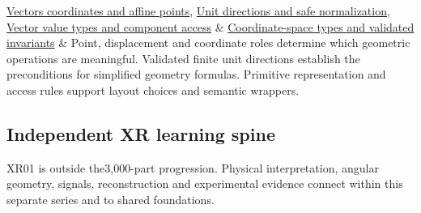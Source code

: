 {\begin{longtable}[]
\hyperref[appendix-0659864c0aa3]{Vectors coordinates and affine points}, \hyperref[appendix-f744e41b95b4]{Unit directions and safe normalization}, \hyperref[appendix-37a39984ba66]{Vector value types and component access} & \hyperref[appendix-380a220e2529]{Coordinate-space types and validated invariants} & Point, displacement and coordinate roles determine which geometric operations are meaningful. Validated finite unit directions establish the preconditions for simplified geometry formulas. Primitive representation and access rules support layout choices and semantic wrappers. \\
\end{longtable}
}

\subsection{Independent XR learning spine}\label{appendix-4ad47bdd269a-independent-xr-learning-spine}

XR01 is outside the3,000-part progression. Physical interpretation, angular geometry, signals, reconstruction and experimental evidence connect within this separate series and to shared foundations.

